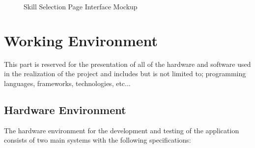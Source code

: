 \begin{figure}[H]
    \centering
    \caption{ Skill Selection Page Interface Mockup }
    \label{fig:Skill-Selection-Page-Interface-Mockup}
\end{figure}



\newpage
\section{Working Environment}
This part is reserved for the presentation of all of the hardware and software used in the realization of the project and includes but is not limited to; programming languages, frameworks, technologies, etc...
\subsection{Hardware Environment}
The hardware environment for the development and testing of the application consists of two main systems with the following specifications:

